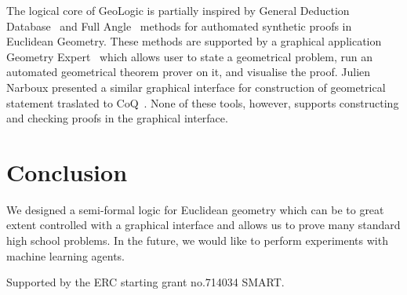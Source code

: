 \documentclass[runningheads]{llncs}
\begin{document}
The logical core of GeoLogic is partially inspired by General
Deduction Database~\cite{GDD} and Full Angle~\cite{FullAngle} methods for authomated synthetic proofs in
Euclidean Geometry.
These methods are supported by a graphical application
Geometry Expert~\cite{GEX} which allows user to state a
geometrical problem, run an automated geometrical theorem prover on
it, and visualise the proof.
Julien Narboux presented a similar graphical interface for
construction of geometrical statement traslated to
CoQ~\cite{GeoProof}.
None of these tools, however, supports constructing and checking
proofs in the graphical interface.

\section{Conclusion}

We designed a semi-formal logic for Euclidean geometry which can be to
great extent controlled with a graphical interface and allows us
to prove many standard high school problems. In the future, we would
like to perform experiments with machine learning agents.

 Supported by the ERC starting grant no.714034 SMART.
\end{document}
